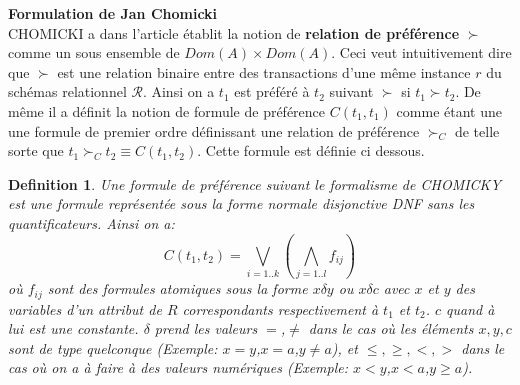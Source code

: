 \documentclass[a4paper,12pt,openany,oneside]{article}
\newtheorem{defn}{Definition} %
\begin{document}
\textbf{Formulation de Jan Chomicki}\\

CHOMICKI a dans l'article \cite{CHO} établit la notion de \textbf{relation de préférence} $\succ$ comme un  sous ensemble de $Dom(A)\times Dom(A)$. Ceci veut intuitivement dire que $\succ$ est une relation binaire entre des transactions d'une même instance $r$ du schémas relationnel $\mathcal{R}$. Ainsi on a $t_{1}$ est préféré à $t_{2}$ suivant $\succ$ si $t_{1}\succ t_{2}$. De même il a définit la notion de formule de préférence $C(t_{1},t_{1})$ comme étant une une formule de premier ordre définissant une relation de préférence $\succ_{C}$ de telle sorte que $t_{1}\succ_{C} t_{2}\equiv C(t_{1},t_{2})$. Cette formule est définie ci dessous. \\
	
	\begin{defn}
	
	 Une formule de préférence suivant le formalisme de CHOMICKY est une formule représentée sous la forme normale disjonctive DNF sans les quantificateurs. Ainsi on a:
	 \[  
	 	C(t_{1},t_{2})=\underset{i=1..k}{\bigvee}(\underset{j=1..l}{\bigwedge} f_{ij})
	 \]
	  où $f_{ij}$  sont des formules atomiques sous la forme $x\delta y$ ou $x\delta c$ avec $x$ et $y$ des variables d'un attribut de $R$ correspondants respectivement à $t_{1}$ et $t_{2}$. $c$ quand à lui est une constante. 
	  $\delta$ prend les valeurs $=$,$\neq$ dans le cas où les éléments $x,y,c$ sont de type quelconque (Exemple: $x=y$,$x=a$,$y\neq a$),  et $\leqslant,\geqslant,<,>$ dans le cas où on a à faire à des valeurs numériques (Exemple: $x<y$,$x<a$,$y\geqslant a$).\\
	\end{defn}
\end{document}
